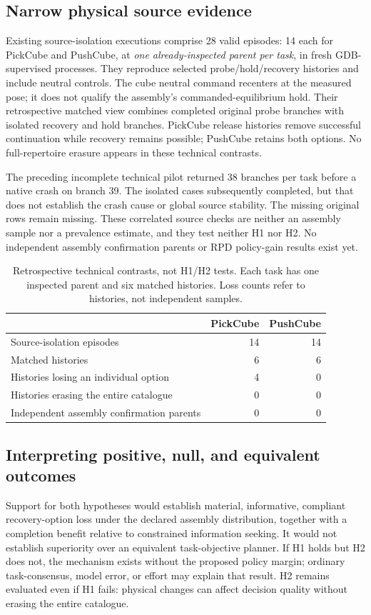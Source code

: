 \documentclass[conference]{IEEEtran}
\begin{document}
\subsection{Narrow physical source evidence}
Existing source-isolation executions comprise 28 valid episodes: 14 each for PickCube and PushCube, at \emph{one already-inspected parent per task}, in fresh GDB-supervised processes. They reproduce selected probe/hold/recovery histories and include neutral controls. The cube neutral command recenters at the measured pose; it does not qualify the assembly's commanded-equilibrium hold. Their retrospective matched view combines completed original probe branches with isolated recovery and hold branches. PickCube release histories remove successful continuation while recovery remains possible; PushCube retains both options. No full-repertoire erasure appears in these technical contrasts.

The preceding incomplete technical pilot returned 38 branches per task before a native crash on branch 39. The isolated cases subsequently completed, but that does not establish the crash cause or global source stability. The missing original rows remain missing. These correlated source checks are neither an assembly sample nor a prevalence estimate, and they test neither H1 nor H2. No independent assembly confirmation parents or RPD policy-gain results exist yet.

\begin{table}[h]
\centering
\caption{Retrospective technical contrasts, not H1/H2 tests. Each task has one inspected parent and six matched histories. Loss counts refer to histories, not independent samples.}
\label{tab:source}
\begin{tabular}{lrr}
\toprule
 & PickCube & PushCube\\
\midrule
Source-isolation episodes & 14 & 14\\
Matched histories & 6 & 6\\
Histories losing an individual option & 4 & 0\\
Histories erasing the entire catalogue & 0 & 0\\
Independent assembly confirmation parents & 0 & 0\\
\bottomrule
\end{tabular}
\end{table}

\subsection{Interpreting positive, null, and equivalent outcomes}
Support for both hypotheses would establish material, informative, compliant recovery-option loss under the declared assembly distribution, together with a completion benefit relative to constrained information seeking. It would not establish superiority over an equivalent task-objective planner. If H1 holds but H2 does not, the mechanism exists without the proposed policy margin; ordinary task-consensus, model error, or effort may explain that result. H2 remains evaluated even if H1 fails: physical changes can affect decision quality without erasing the entire catalogue.
\end{document}
